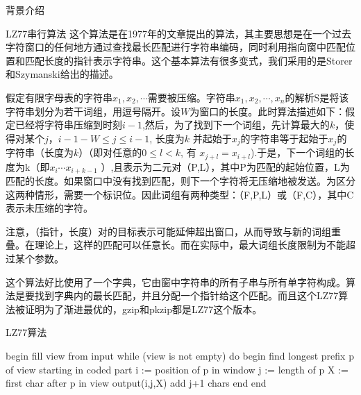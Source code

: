 \documentclass[letterpaper,12pt]{article}
\begin{document}
\begin{section}{背景介绍}
    \begin{subsection}{LZ77串行算法}
        这个算法是在1977年的文章提出的算法，其主要思想是在一个过去字符窗口的任何地方通过查找最长匹配进行字符串编码，同时利用指向窗中匹配位置和匹配长度的指针表示字符串。这个基本算法有很多变式，我们采用的是Storer和Szymanski给出的描述。\\ \par
        假定有限字母表的字符串$x_1,x_2,\cdots$需要被压缩。字符串$x_1,x_2,\cdots,x_n$的解析S是将该字符串划分为若干词组，用逗号隔开。设$W$为窗口的长度。此时算法描述如下：假定已经将字符串压缩到时刻$i-1$,然后，为了找到下一个词组，先计算最大的$k$，使得对某个$j$，$i-1-W\le j \le i-1$, 长度为$k$ 并起始于$x_j$的字符串等于起始于$x_j$的字符串（长度为$k$）（即对任意的$0\le l < k$, 有 $x_{j+l} = x_{i+l}$).于是，下一个词组的长度为k（即$x_i\cdots x_{i+k-1}$ ）,且表示为二元对（P,L），其中P为匹配的起始位置，L为匹配的长度。如果窗口中没有找到匹配，则下一个字符将无压缩地被发送。为区分这两种情形，需要一个标识位。因此词组有两种类型：（F,P,L）或（F,C），其中C表示未压缩的字符。\\ \par
        注意，（指针，长度）对的目标表示可能延伸超出窗口，从而导致与新的词组重叠。在理论上，这样的匹配可以任意长。而在实际中，最大词组长度限制为不能超过某个参数。\\ \par
        这个算法好比使用了一个字典，它由窗中字符串的所有子串与所有单字符构成。算法是要找到字典内的最长匹配，并且分配一个指针给这个匹配。而且这个LZ77算法被证明为了渐进最优的，gzip和pkzip都是LZ77这个版本。
    \begin{algorithm}[!htbp]  
      \caption{LZ77算法}  
      \label{alg:LZ77算法}  
      \begin{algorithmic}[1]  
        \State begin
        \State \quad fill view from input
        \State \quad while (view is not empty) do 
        \State \quad begin
        \State \quad \quad find longest prefix p of view starting in coded part
        \State \quad \quad i := position of p in window
        \State \quad \quad j := length of p
        \State \quad \quad X := first char after p in view
        \State \quad \quad output(i,j,X)
        \State \quad \quad add j+1 chars
        \State \quad end
        \State end 
      \end{algorithmic}  
    \end{algorithm}  

    \end{subsection}

\end{section}
\end{document}
